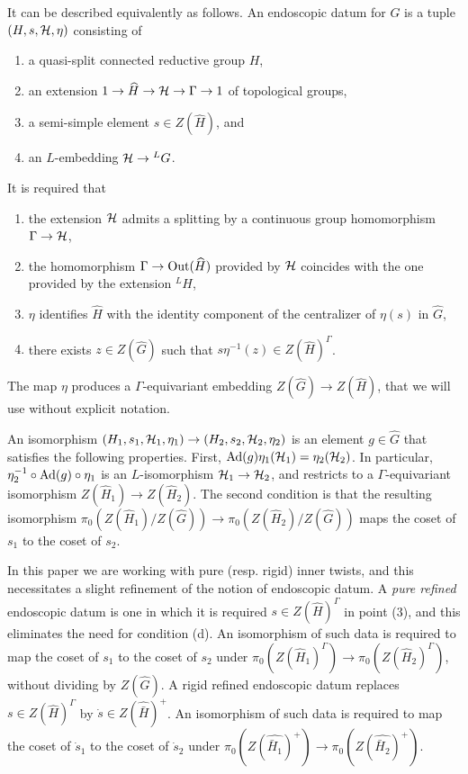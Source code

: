 \documentclass{article}
\theoremstyle{definition}
\numberwithin{equation}{section}
\renewcommand{\-}{\hyp{}}
\begin{document}
It can be described equivalently as follows. An endoscopic datum for $G$ is a tuple $(H,s,\mathcal{H},\eta)$ consisting of
\begin{enumerate}[label=(\arabic*)]
	\item a quasi-split connected reductive group $H$,
	\item an extension $1 \to \widehat H \to \mathcal{H} \to \Gamma \to 1$ of topological groups,
	\item a semi-simple element $s \in Z(\hat H)$, and
	\item an $L$-embedding $\mathcal{H} \to {^LG}$.
\end{enumerate}
It is required that
\begin{enumerate}[label=(\alph*)]
	\item the extension $\mathcal{H}$ admits a splitting by a continuous group homomorphism $\Gamma \to \mathcal{H}$,
	\item the homomorphism $\Gamma \to \textrm{Out}(\widehat H)$ provided by $\mathcal{H}$ coincides with the one provided by the extension $^LH$,
	\item $\eta$ identifies $\hat H$ with the identity component of the centralizer of $\eta(s)$ in $\hat G$,
	\item there exists $z \in Z(\hat G)$ such that $s\eta^{-1}(z) \in Z(\hat H)^\Gamma$.
\end{enumerate}
The map $\eta$ produces a $\Gamma$-equivariant embedding $Z(\hat G) \to Z(\hat H)$, that we will use without explicit notation.

An isomorphism $(H_1,s_1,\mathcal{H}_1,\eta_1) \to (H_2,s_2,\mathcal{H}_2,\eta_2)$ is an element $g \in \hat G$ that satisfies the following properties. First, $\textrm{Ad}(g)\eta_1(\mathcal{H}_1)=\eta_2(\mathcal{H}_2)$. In particular, $\eta_2^{-1}\circ\textrm{Ad}(g)\circ\eta_1$ is an $L$-isomorphism $\mathcal{H}_1 \to \mathcal{H}_2$, and restricts to a $\Gamma$-equivariant isomorphism $Z(\hat H_1) \to Z(\hat H_2)$. The second condition is that the resulting isomorphism $\pi_0(Z(\hat H_1)/Z(\hat G)) \to \pi_0(Z(\hat H_2)/Z(\hat G))$ maps the coset of $s_1$ to the coset of $s_2$.

In this paper we are working with pure (resp. rigid) inner twists, and this necessitates a slight refinement of the notion of endoscopic datum. A \emph{pure refined} endoscopic datum is one in which it is required $s \in Z(\hat H)^\Gamma$ in point (3), and this eliminates the need for condition (d). An isomorphism of such data is required to map the coset of $s_1$ to the coset of $s_2$ under $\pi_0(Z(\hat H_1)^\Gamma) \to \pi_0(Z(\hat H_2)^\Gamma)$, without dividing by $Z(\hat G)$. A rigid refined endoscopic datum replaces $s \in Z(\hat H)^\Gamma$ by $\dot s \in Z(\hat{\bar H})^+$. An isomorphism of such data is required to map the coset of $\dot s_1$ to the coset of $\dot s_2$ under $\pi_0(Z(\hat{\bar H_1})^+) \to \pi_0(Z(\hat{ \bar H_2})^+)$.
\end{document}
